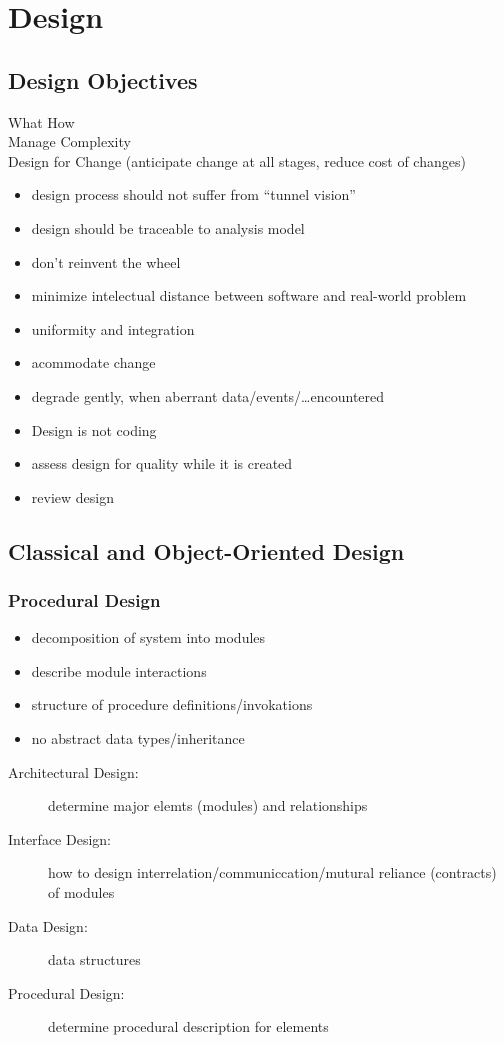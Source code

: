 \documentclass[a4paper, 10pt]{article}
\begin{document}
\section*{Design}

\subsection*{Design Objectives}
What \follows How \\
Manage Complexity \\
Design for Change (anticipate change at all stages, reduce cost of changes)

\begin{itemize}
	\item design process should not suffer from ``tunnel vision''
	\item design should be traceable to analysis model
	\item don't reinvent the wheel
	\item minimize intelectual distance between software and real-world problem
	\item uniformity and integration
	\item acommodate change
	\item degrade gently, when aberrant data/events/\dots encountered
	\item Design is not coding
	\item assess design for quality while it is created
	\item review design
\end{itemize}

\subsection*{Classical and Object-Oriented Design}
\subsubsection*{Procedural Design}
\begin{itemize}
	\item decomposition of system into modules
	\item describe module interactions
	\item structure of procedure definitions/invokations
	\item no abstract data types/inheritance
\end{itemize}
\begin{description}
	\item[Architectural Design:] determine major elemts (modules) and relationships
	\item[Interface Design:] how to design interrelation/communiccation/mutural reliance (contracts) of modules
	\item[Data Design:] data structures
	\item[Procedural Design:] determine procedural description for elements
\end{description}
\end{document}
